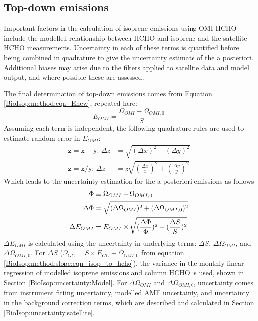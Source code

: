 \documentclass[acp, manuscript]{copernicus}
\newcommand{\Oomi}{\Omega_{OMI}} %
\newcommand{\Ogc}{\Omega_{GC}}  %
\newcommand{\apri}{E_{GC}} %
\newcommand{\apost}{E_{OMI}} %
\begin{document}
  \subsection{Top-down emissions}
    \label{BioIsop:uncertainty:eomi}
    
    Important factors in the calculation of isoprene emissions using OMI HCHO include the modelled relationship between HCHO and isoprene and the satellite HCHO measurements.
    Uncertainty in each of these terms is quantified before being combined in quadrature to give the uncertainty estimate of the a posteriori.
    Additional biases may arise due to the filters applied to satellite data and model output, and where possible these are assessed. 
    
    The final determination of top-down emissions comes from Equation \ref{BioIsop:method:eqn_Enew}, repeated here: 
    \begin{equation*}
      \apost=\frac{\Oomi - \Omega_{OMI,0}}{S}
    \end{equation*}
    Assuming each term is independent, the following quadrature rules are used to estimate random error in $\apost$:
    \begin{align}
      \mathtt{z=x+y:} \, \Delta{z} & = \sqrt{(\Delta{x})^2 + (\Delta{y})^2} \label{BioIsop:uncertainty:eqn_quadrature_add} \\
      \mathtt{z=x/y:} \, \Delta{z} & = z \sqrt{(\frac{\Delta{x}}{x})^2 + (\frac{\Delta{y}}{y})^2} \label{BioIsop:uncertainty:eqn_quadrature_divide} 
    \end{align}
    Which leads to the uncertainty estimation for the a posteriori emissions as follows
    \begin{align}
      \Phi & \equiv \Oomi - \Omega_{OMI,0}   \notag \\
      \Delta{\Phi} & = \sqrt{(\Delta{\Oomi})^2 + (\Delta{\Omega_{OMI,0}})^2}  \label{BioIsop:uncertainty:eomi:eqn_delta_Phi} \\
      \Delta{\apost} &= \apost \times \sqrt{(\frac{\Delta{\Phi}}{\Phi})^2 + (\frac{\Delta{S}}{S})^2} \label{BioIsop:uncertainty:eomi:eqn_delta_apost}
    \end{align}
    $\Delta{\apost}$ is calculated using the uncertainty in underlying terms: $\Delta{S}$, $\Delta{\Oomi}$, and $\Delta{\Omega_{OMI,0}}$. 
    For $\Delta{S}$ ($\Ogc = S \times \apri + \Omega_{OMI,0}$ from equation \ref{BioIsop:method:slope:eqn_isop_to_hcho}), the variance in the monthly linear regression of modelled isoprene emissions and column HCHO is used, shown in Section \ref{BioIsop:uncertainty:Model}.
    For $\Delta \Oomi$ and $\Delta \Omega_{OMI,0}$, uncertainty comes from instrument fitting uncertainty, modelled AMF uncertainty, and uncertainty in the background correction terms, which are described and calculated in Section \ref{BioIsop:uncertainty:satellite}.
    
\end{document}
